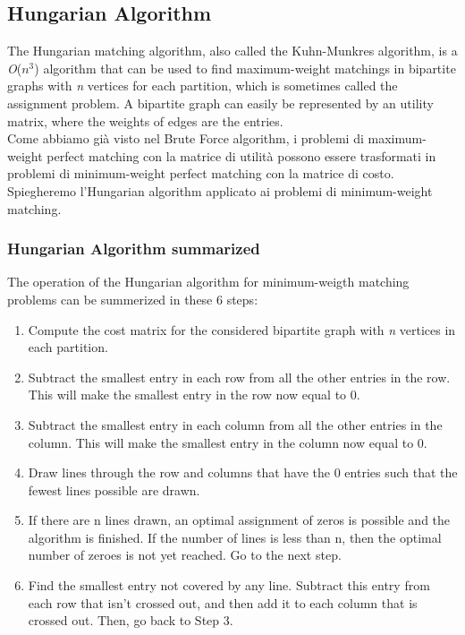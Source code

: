 \subsection{Hungarian Algorithm}

The Hungarian matching algorithm, also called the Kuhn-Munkres algorithm, is a \textit{O}($\textit{n}^3$) algorithm that can be used to find maximum-weight matchings in bipartite graphs with \textit{n} vertices for each partition, which is sometimes called the assignment problem.
A bipartite graph can easily be represented by an utility matrix, where the weights of edges are the entries. \\
Come abbiamo già visto nel Brute Force algorithm, i problemi di maximum-weight perfect matching con la matrice di utilità possono essere trasformati in problemi di minimum-weight perfect matching con la matrice di costo.
Spiegheremo l'Hungarian algorithm applicato ai problemi di minimum-weight matching.
\\

\subsubsection{Hungarian Algorithm summarized}

The operation of the Hungarian algorithm for minimum-weigth matching problems can be summerized in these 6 steps:
\begin{enumerate}
    \item {Compute the cost matrix for the considered bipartite graph with \textit{n} vertices in each partition.}
    \item {Subtract the smallest entry in each row from all the other entries in the row. This will make the smallest entry in the row now equal to 0.}
    \item {Subtract the smallest entry in each column from all the other entries in the column. This will make the smallest entry in the column now equal to 0.}
    \item {Draw lines through the row and columns that have the 0 entries such that the fewest lines possible are drawn.}
    \item {If there are n lines drawn, an optimal assignment of zeros is possible and the algorithm is finished. If the number of lines is less than n, then the optimal number of zeroes is not yet reached. Go to the next step.}
    \item {Find the smallest entry not covered by any line. Subtract this entry from each row that isn’t crossed out, and then add it to each column that is crossed out. Then, go back to Step 3.}
\end{enumerate}

